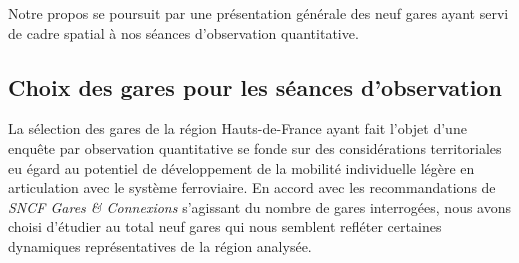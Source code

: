 \begin{refsegment}
Notre propos se poursuit par une présentation générale des neuf gares ayant servi de cadre spatial à nos séances d'observation quantitative.%

\subsection{Choix des gares pour les séances d'observation
    \label{chap3:observation-quantitative-gares-examinees}
    }

La sélection des gares de la région Hauts-de-France ayant fait l’objet d’une enquête par observation quantitative se fonde sur des considérations territoriales eu égard au potentiel de développement de la mobilité individuelle légère en articulation avec le système ferroviaire. En accord avec les recommandations de \textsl{SNCF Gares \& Connexions} s’agissant du nombre de gares interrogées, nous avons choisi d’étudier au total neuf gares qui nous semblent refléter certaines dynamiques représentatives de la région analysée.%


\end{refsegment}
